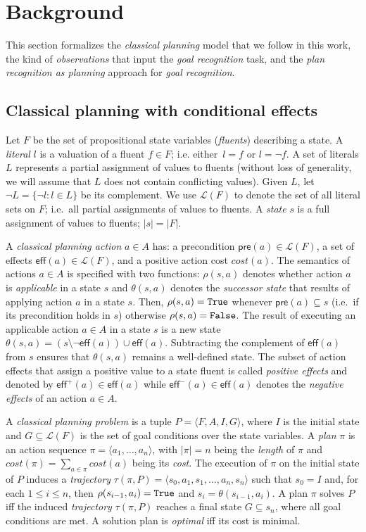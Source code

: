 \documentclass[letterpaper]{article} %
\newcommand{\tup}[1]{{\langle #1 \rangle}}
\newcommand{\pre}{\mathsf{pre}}     %
\newcommand{\eff}{\mathsf{eff}}     %
\begin{document}
\section{Background}
\label{sec:background}
This section formalizes the {\em classical planning} model that we follow in this work, the kind of {\em observations} that input the {\em goal recognition} task, and the {\em plan recognition as planning} approach for {\em goal recognition}.  

\subsection{Classical planning with conditional effects}
Let $F$ be the set of  propositional state variables ({\em fluents}) describing a state. A {\em literal} $l$ is a valuation of a fluent $f\in F$; i.e. either~$l=f$ or $l=\neg f$. A set of literals $L$ represents a partial assignment of values to fluents (without loss of generality, we will assume that $L$ does not contain conflicting values). Given $L$, let $\neg L=\{\neg l:l\in L\}$ be its complement. We use $\mathcal{L}(F)$ to denote the set of all literal sets on $F$; i.e.~all partial assignments of values to fluents. A {\em state} $s$ is a full assignment of values to fluents; $|s|=|F|$.

A {\em classical planning action} $a\in A$ has: a precondition $\pre(a)\in\mathcal{L}(F)$, a set of effects $\eff(a)\in\mathcal{L}(F)$, and a positive action cost $cost(a)$. The semantics of actions $a\in A$ is specified with two functions: $\rho(s,a)$ denotes whether action $a$ is {\em applicable} in a state $s$ and $\theta(s,a)$ denotes the {\em successor state} that results of applying action $a$ in a state $s$. Then, $\rho(s,a)={\tt\small True}$ whenever $\pre(a)\subseteq s$ (i.e.~if its precondition holds in $s$) otherwise $\rho(s,a)={\tt\small False}$. The result of executing an applicable action $a\in A$ in a state $s$ is a new state $\theta(s,a)=(s\setminus \neg\eff(a))\cup\eff(a)$. Subtracting the complement of $\eff(a)$ from $s$ ensures that $\theta(s,a)$ remains a well-defined state. The subset of action effects that assign a positive value to a state fluent is called {\em positive effects} and denoted by $\eff^+(a)\in \eff(a)$ while $\eff^-(a)\in \eff(a)$ denotes the {\em negative effects} of an action $a\in A$.

A {\em classical planning problem} is a tuple $P=\tup{F,A,I,G}$, where $I$ is the initial state and $G\subseteq\mathcal{L}(F)$ is the set of goal conditions over the state variables. A {\em plan} $\pi$ is an action sequence $\pi=\tup{a_1, \ldots, a_n}$, with $|\pi|=n$ being the {\em length} of $\pi$ and $cost(\pi)=\sum_{a\in\pi} cost(a)$ being its {\em cost}. The execution of $\pi$ on the initial state of $P$ induces a {\em trajectory} $\tau(\pi,P)=\tup{s_0, a_1, s_1, \ldots, a_n, s_n}$ such that $s_0=I$ and, for each {\small $1\leq i\leq n$}, then $\rho(s_{i-1},a_i)={\tt\small True}$ and $s_i=\theta(s_{i-1},a_i)$. A plan $\pi$ solves $P$ iff the induced {\em trajectory} $\tau(\pi,P)$ reaches a final state $G \subseteq s_n$, where all goal conditions are met. A solution plan is {\em optimal} iff its cost is minimal.
\end{document}
